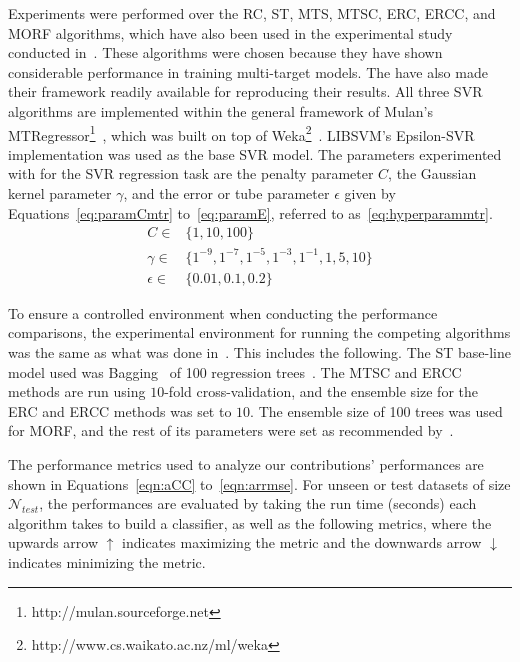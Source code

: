 \documentclass[reqno]{vcuthesis}
\numberwithin{equation}{chapter}
\begin{document}
Experiments were performed over the RC, ST, MTS, MTSC, ERC, ERCC, and MORF algorithms, which have also been used in the experimental study conducted in~\cite{Spyromitros2014}. These algorithms were chosen because they have shown considerable performance in training multi-target models. The have also made their framework readily available for reproducing their results. All three SVR algorithms are implemented within the general framework of Mulan's MTRegressor\footnote{http://mulan.sourceforge.net}~\cite{mulan}, which was built on top of Weka\footnote{http://www.cs.waikato.ac.nz/ml/weka}~\cite{Hall2009}. LIBSVM's Epsilon-SVR~\cite{CC01a} implementation was used as the base SVR model. The parameters experimented with for the SVR regression task are the penalty parameter $C$, the Gaussian kernel parameter $\gamma$, and the error or tube parameter $\epsilon$ given by Equations~\eqref{eq:paramCmtr} to~\eqref{eq:paramE}, referred to as~\eqref{eq:hyperparammtr}.
\begin{subequations}
\label{eq:hyperparammtr}
\begin{align}
C \in  & \{1, 10, 100\} \label{eq:paramCmtr}\\
\gamma \in  & \{1^{-9}, 1^{-7}, 1^{-5}, 1^{-3}, 1^{-1}, 1, 5, 10\} \label{eq:mtrparamG}\\
\epsilon \in  & \{0.01, 0.1, 0.2\} \label{eq:paramE}
\end{align}
\end{subequations}

To ensure a controlled environment when conducting the performance comparisons, the experimental environment for running the competing algorithms was the same as what was done in~\cite{Spyromitros2014}. This includes the following. The ST base-line model used was Bagging~\cite{Breiman1996} of 100 regression trees~\cite{Wu2015430}. The MTSC and ERCC methods are run using $10$-fold cross-validation, and the ensemble size for the ERC and ERCC methods was set to $10$. The ensemble size of 100 trees was used for MORF, and the rest of its parameters were set as recommended by~\cite{Kocev2013}.

The performance metrics used to analyze our contributions' performances are shown in Equations~\ref{eqn:aCC} to~\ref{eqn:arrmse}. For unseen or test datasets of size $\mathcal N_{test}$, the performances are evaluated by taking the run time (seconds) each algorithm takes to build a classifier, as well as the following metrics, where the upwards arrow $\uparrow$ indicates maximizing the metric and the downwards arrow $\downarrow$ indicates minimizing the metric.
\end{document}

